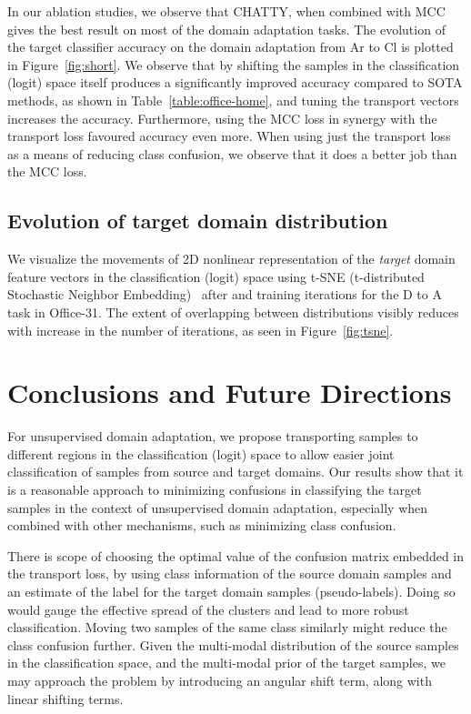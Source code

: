 \documentclass[10pt,twocolumn,letterpaper]{article}
\begin{document}
In our ablation studies, we observe that CHATTY, when combined with MCC~\cite{mcc} gives the best result on most of the domain adaptation tasks. The evolution of the target classifier accuracy on the domain adaptation from Ar to Cl is plotted in Figure~\ref{fig:short}. We observe that by shifting the samples in the classification (logit) space itself produces a significantly improved accuracy compared to SOTA methods, as shown in Table~\ref{table:office-home}, and tuning the transport vectors increases the accuracy. Furthermore, using the MCC loss in synergy with the transport loss favoured accuracy even more. When using just the transport loss as a means of reducing class confusion, we observe that it does a better job than the MCC loss.

\subsection{Evolution of target domain distribution}

We visualize the movements of 2D nonlinear representation of the \emph{target} domain feature vectors in the classification (logit) space using t-SNE (t-distributed Stochastic Neighbor Embedding)~\cite{tsne} after  and  training iterations for the D to A task in Office-31. The extent of overlapping between distributions visibly reduces with increase in the number of iterations, as seen in Figure~\ref{fig:tsne}.

\section{Conclusions and Future Directions}

For unsupervised domain adaptation, we propose transporting samples to different regions in the classification (logit) space to allow easier joint classification of samples from source and target domains. Our results show that it is a reasonable approach to minimizing confusions in classifying the target samples in the context of unsupervised domain adaptation, especially when combined with other mechanisms, such as minimizing class confusion.

There is scope of choosing the optimal value of the confusion matrix embedded in the transport loss, by using class information of the source domain samples and an estimate of the label for the target domain samples (pseudo-labels). Doing so would gauge the effective spread of the clusters and lead to more robust classification. Moving two samples of the same class similarly might reduce the class confusion further. Given the multi-modal distribution of the source samples in the classification space, and the multi-modal prior of the target samples, we may approach the problem by introducing an angular shift term, along with linear shifting terms. 
{\small


}
 
\end{document}
